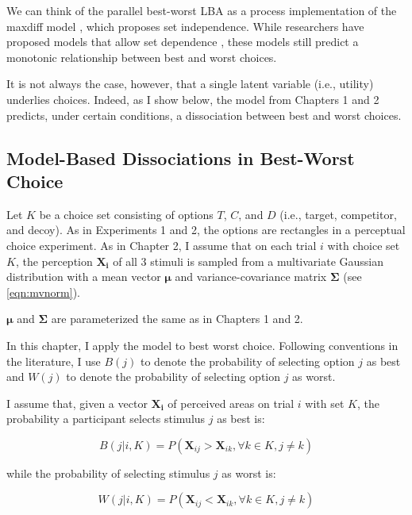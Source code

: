 We can think of the parallel best-worst LBA as a process implementation of the maxdiff model \parencite{hawkinsIntegratingCognitiveProcess2014a}, which proposes set independence. While researchers have proposed models that allow set dependence \parencite{marleyProbabilisticModelsSetdependent2008}, these models still predict a monotonic relationship between best and worst choices. 

It is not always the case, however, that a single latent variable (i.e., utility) underlies choices. Indeed, as I show below, the model from Chapters 1 and 2 predicts, under certain conditions, a dissociation between best and worst choices.

\subsection{Model-Based Dissociations in Best-Worst Choice}

Let $K$ be a choice set consisting of options $T$, $C$, and $D$ (i.e., target, competitor, and decoy). As in Experiments 1 and 2, the options are rectangles in a perceptual choice experiment. As in Chapter 2, I assume that on each trial $i$ with choice set $K$, the perception $\mathbf{X_i}$ of all 3 stimuli is sampled from a multivariate Gaussian distribution with a mean vector $\boldsymbol{\mu}$ and variance-covariance matrix $\boldsymbol{\Sigma}$ (see \ref{eqn:mvnorm}).

$\boldsymbol{\mu}$ and $\boldsymbol{\Sigma}$ are parameterized the same as in Chapters 1 and 2. 

In this chapter, I apply the model to best worst choice. Following conventions in the literature, I use $B(j)$ to denote the probability of selecting option $j$ as best and $W(j)$ to denote the probability of selecting option $j$ as worst. 

I assume that, given a vector $\mathbf{X_{i}}$ of perceived areas on trial $i$ with set $K$, the probability a participant selects stimulus $j$ as best is:

\begin{equation}
   B(j|i,K)=P(\mathbf{X}_{ij}>\mathbf{X}_{ik}, \forall k \in K, j \neq k)
   \label{eqn:bchoice1}
\end{equation}

while the probability of selecting stimulus $j$ as worst is:

\begin{equation}
   W(j|i,K)=P(\mathbf{X}_{ij}<\mathbf{X}_{ik}, \forall k \in K, j \neq k)
   \label{eqn:wchoice1}
\end{equation}

